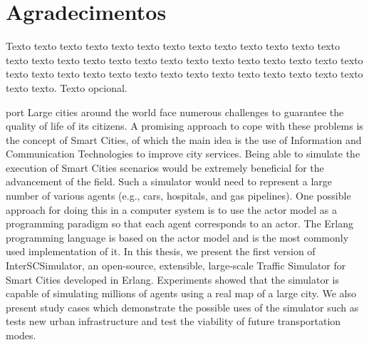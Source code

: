 \chapter*{Agradecimentos}

Texto texto texto texto texto texto texto texto texto texto texto texto texto
texto texto texto texto texto texto texto texto texto texto texto texto texto
texto texto texto texto texto texto texto texto texto texto texto texto texto
texto texto texto texto. Texto opcional.

\begin{resumo}{port}
Large cities around the world face numerous challenges to guarantee the quality of life of its citizens. A promising approach to cope with these problems is the concept of Smart Cities, of which the main idea is the use of Information and Communication Technologies to improve city services. Being able to simulate the execution of Smart Cities scenarios would be extremely beneficial for the advancement of the field. Such a simulator would need to represent a large number of various agents (e.g., cars, hospitals, and gas pipelines). One possible approach for doing this in a computer system is to use the actor model as a programming paradigm so that each agent corresponds to an actor. The Erlang programming language is based on the actor model and is the most commonly used implementation of it. In this thesis, we present the first version of InterSCSimulator, an open-source, extensible, large-scale Traffic Simulator for Smart Cities developed in Erlang. Experiments showed that the simulator is capable of simulating millions of agents using a real map of a large city. We also present study cases which demonstrate the possible uses of the simulator such as tests new urban infrastructure and test the viability of future transportation modes.
\end{resumo}


